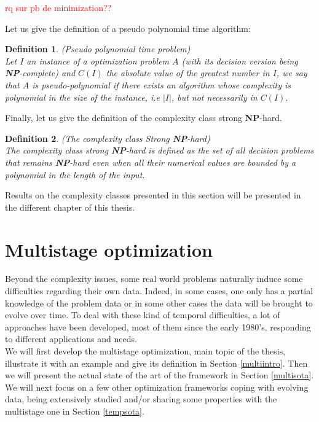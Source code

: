 \documentclass[a4paper]{book}
\newtheorem{definition}{Definition}
\newcommand{\alex}[2]{\textcolor{red}{#1}}
\begin{document}
\alex{rq sur pb de minimization??}\\

Let us give the definition of a pseudo polynomial time algorithm:
\begin{definition}{\emph{(Pseudo polynomial time problem)}}\\
Let $I$ an instance of a optimization problem $A$ (with its decision version being \textbf{NP}-complete) and $C(I)$ the absolute value of the greatest number in $I$, we say that $A$ is pseudo-polynomial if there exists an algorithm whose complexity is polynomial in the size of the instance, i.e $|I|$, but not necessarily in $C(I)$.  

\end{definition}

Finally, let us give the definition of the complexity class strong \textbf{NP}-hard.

\begin{definition}{\emph{(The complexity class Strong \textbf{NP}-hard)}}\\
The complexity class strong \textbf{NP}-hard is defined as the set of all decision problems that remains \textbf{NP}-hard even when all their numerical values are bounded by a polynomial in the length of the input.

\end{definition}

Results on the complexity classes presented in this section will be presented in the different chapter of this thesis.  



\section{Multistage optimization}
Beyond the complexity issues, some real world problems naturally induce some difficulties regarding their own data. Indeed, in some cases, one only has a partial knowledge of the problem data or in some other cases the data will be brought to evolve over time. To deal with these kind of temporal difficulties, a lot of approaches have been developed, most of them since the early 1980's, responding to different applications and needs. \\
We will first develop the multistage optimization, main topic of the thesis, illustrate it with an example and give its definition in Section \ref{multiintro}. Then we will present the actual state of the art of the framework in Section \ref{multisota}. \\
We will next focus on a few other optimization frameworks coping with evolving data, being extensively studied and/or sharing some properties with the multistage one in Section \ref{tempsota}. 
\end{document}
